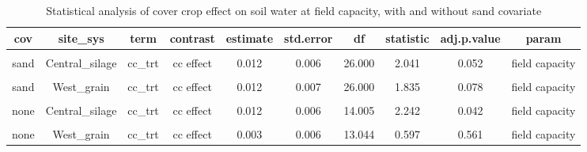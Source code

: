 \documentclass[
]{article}
\begin{document}
\begin{table}[H]

\caption{\label{tab:fc}Statistical analysis of cover crop effect on soil water at field capacity, with and without sand covariate}
\centering
\begin{tabular}[t]{cccccccccc}
\toprule
cov & site\_sys & term & contrast & estimate & std.error & df & statistic & adj.p.value & param\\
\midrule
\cellcolor{gray!6}{sand} & \cellcolor{gray!6}{Central\_grain} & \cellcolor{gray!6}{cc\_trt} & \cellcolor{gray!6}{cc effect} & \cellcolor{gray!6}{-0.002} & \cellcolor{gray!6}{0.006} & \cellcolor{gray!6}{26.000} & \cellcolor{gray!6}{-0.430} & \cellcolor{gray!6}{0.671} & \cellcolor{gray!6}{field capacity}\\
\cmidrule{1-10}
sand & Central\_silage & cc\_trt & cc effect & 0.012 & 0.006 & 26.000 & 2.041 & 0.052 & field capacity\\
\cmidrule{1-10}
\cellcolor{gray!6}{sand} & \cellcolor{gray!6}{East\_grain} & \cellcolor{gray!6}{cc\_trt} & \cellcolor{gray!6}{cc effect} & \cellcolor{gray!6}{-0.002} & \cellcolor{gray!6}{0.006} & \cellcolor{gray!6}{26.000} & \cellcolor{gray!6}{-0.353} & \cellcolor{gray!6}{0.727} & \cellcolor{gray!6}{field capacity}\\
\cmidrule{1-10}
sand & West\_grain & cc\_trt & cc effect & 0.012 & 0.007 & 26.000 & 1.835 & 0.078 & field capacity\\
\cmidrule{1-10}
\cellcolor{gray!6}{none} & \cellcolor{gray!6}{Central\_grain} & \cellcolor{gray!6}{cc\_trt} & \cellcolor{gray!6}{cc effect} & \cellcolor{gray!6}{-0.004} & \cellcolor{gray!6}{0.005} & \cellcolor{gray!6}{13.044} & \cellcolor{gray!6}{-0.800} & \cellcolor{gray!6}{0.438} & \cellcolor{gray!6}{field capacity}\\
\cmidrule{1-10}
none & Central\_silage & cc\_trt & cc effect & 0.012 & 0.006 & 14.005 & 2.242 & 0.042 & field capacity\\
\cmidrule{1-10}
\cellcolor{gray!6}{none} & \cellcolor{gray!6}{East\_grain} & \cellcolor{gray!6}{cc\_trt} & \cellcolor{gray!6}{cc effect} & \cellcolor{gray!6}{-0.007} & \cellcolor{gray!6}{0.006} & \cellcolor{gray!6}{13.044} & \cellcolor{gray!6}{-1.317} & \cellcolor{gray!6}{0.211} & \cellcolor{gray!6}{field capacity}\\
\cmidrule{1-10}
none & West\_grain & cc\_trt & cc effect & 0.003 & 0.006 & 13.044 & 0.597 & 0.561 & field capacity\\
\bottomrule
\end{tabular}
\end{table}
\end{document}
